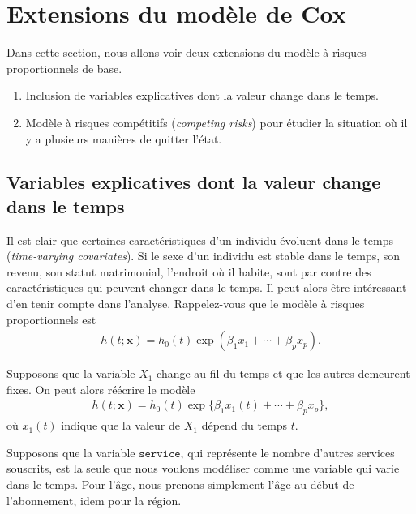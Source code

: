 \documentclass[
  11pt,
  letterpaper,
]{book}
\providecommand{\tightlist}{%
  \setlength{\itemsep}{0pt}\setlength{\parskip}{0pt}}
\theoremstyle{definition}
\theoremstyle{definition}
\theoremstyle{definition}
\theoremstyle{remark}
\begin{document}
\hypertarget{extensions-du-moduxe8le-de-cox}{%
\section{Extensions du modèle de Cox}\label{extensions-du-moduxe8le-de-cox}}

Dans cette section, nous allons voir deux extensions du modèle à risques proportionnels de base.

\begin{enumerate}
\def\labelenumi{\roman{enumi})}
\tightlist
\item
  Inclusion de variables explicatives dont la valeur change dans le temps.
\item
  Modèle à risques compétitifs (\emph{competing risks}) pour étudier la situation où il y a plusieurs manières de quitter l'état.
\end{enumerate}

\hypertarget{variables-explicatives-dont-la-valeur-change-dans-le-temps}{%
\subsection{Variables explicatives dont la valeur change dans le temps}\label{variables-explicatives-dont-la-valeur-change-dans-le-temps}}

Il est clair que certaines caractéristiques d'un individu évoluent dans le temps (\emph{time-varying covariates}). Si le sexe d'un individu est stable dans le temps, son revenu, son statut matrimonial, l'endroit où il habite, sont par contre des caractéristiques qui peuvent changer dans le temps. Il peut alors être intéressant d'en tenir compte dans l'analyse. Rappelez-vous que le modèle à risques proportionnels est
\begin{align*}
h(t; \boldsymbol{x}) = h_0(t) \exp(\beta_1x_1 + \cdots + \beta_px_p).
\end{align*}

Supposons que la variable \(X_1\) change au fil du temps et que les autres demeurent fixes. On peut alors réécrire le modèle
\begin{align*}
h(t; \boldsymbol{x}) = h_0(t) \exp\{\beta_1x_1(t) + \cdots + \beta_px_p\},
\end{align*}
où \(x_1(t)\) indique que la valeur de \(X_1\) dépend du temps \(t\).

Supposons que la variable \(\texttt{service}\), qui représente le nombre d'autres services souscrits, est la seule que nous voulons modéliser comme une variable qui varie dans le temps. Pour l'âge, nous prenons simplement l'âge au début de l'abonnement, idem pour la région.
\end{document}
